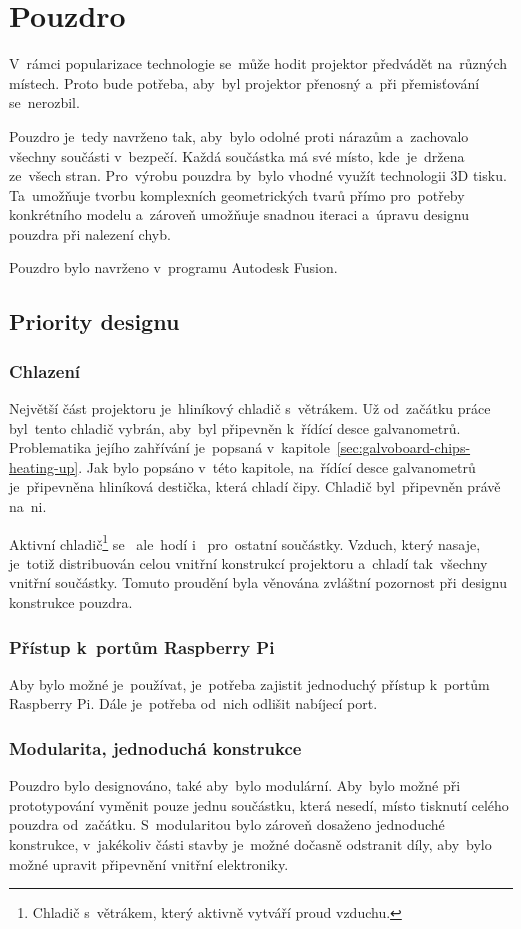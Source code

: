 \section{Pouzdro}

V~rámci popularizace technologie se~může hodit projektor předvádět na~různých místech. Proto bude potřeba,  aby~byl projektor přenosný a~při přemisťování se~nerozbil.

Pouzdro je~tedy navrženo tak,  aby~bylo odolné proti nárazům a~zachovalo všechny součásti v~bezpečí. Každá součástka má své místo,  kde~je~držena ze~všech stran.  Pro~výrobu pouzdra by~bylo vhodné využít technologii 3D tisku. Ta~umožňuje tvorbu komplexních geometrických tvarů přímo  pro~potřeby konkrétního modelu a~zároveň umožňuje snadnou iteraci a~úpravu designu pouzdra při nalezení chyb.

Pouzdro bylo navrženo  v~programu Autodesk Fusion.

\subsection{Priority designu} \label{sec:krabick-design-priorities}
\subsubsection{Chlazení}
Největší část projektoru je~hliníkový chladič s~větrákem. Už od~začátku práce  byl~tento chladič vybrán,  aby~byl připevněn k~řídící desce galvanometrů. Problematika jejího zahřívání je~popsaná v~kapitole~\ref{sec:galvoboard-chips-heating-up}.
Jak bylo popsáno v~této kapitole, na~řídící desce galvanometrů je~připevněna hliníková destička, která chladí čipy. Chladič  byl~připevněn právě na~ni.

Aktivní chladič\footnote{Chladič s~větrákem, který aktivně vytváří proud vzduchu.} se ~ale~hodí i ~pro~ostatní součástky. Vzduch, který nasaje, je~totiž distribuován celou vnitřní konstrukcí projektoru a~chladí  tak~všechny vnitřní součástky. Tomuto proudění byla věnována zvláštní pozornost při designu konstrukce pouzdra.

\subsubsection{Přístup k~portům Raspberry Pi}
Aby bylo možné je~používat, je~potřeba zajistit jednoduchý přístup  k~portům Raspberry Pi. Dále je~potřeba od~nich odlišit nabíjecí port.

\subsubsection{Modularita, jednoduchá konstrukce}
Pouzdro bylo designováno, také  aby~bylo modulární.  Aby~bylo možné při prototypování vyměnit pouze jednu součástku, která nesedí, místo tisknutí celého pouzdra od~začátku. S~modularitou bylo zároveň dosaženo jednoduché konstrukce, v~jakékoliv části stavby je~možné dočasně odstranit díly,  aby~bylo možné upravit připevnění vnitřní elektroniky.

